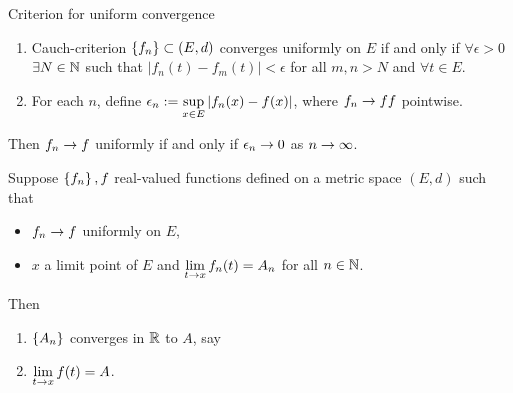 \documentclass[]{article}
\begin{document}
\begin{recall}
	Criterion for uniform convergence
	\begin{enumerate}
		\item Cauch-criterion $\left\{ f_n \right\}\subset(E,d)$ converges uniformly on $E$ if and only if $\forall\epsilon>0$ $\exists N\in\mathbb{N}$ such that $|f_n(t)-f_m(t)|<\epsilon$ for all $m,n>N$ and $\forall t\in E$.
		\item For each $n$, define $\displaystyle\epsilon_n:=\sup_{x\in E} |f_n(x)-f(x)|$, where $f_n\rightarrow ff$ pointwise.
	\end{enumerate}
	Then $f_n\rightarrow f$ uniformly if and only if $\epsilon_n\rightarrow0$ as $n\rightarrow\infty$.
\end{recall}

\newpage

\begin{theorem}
	\label{thm-7-11}
	Suppose $\left\{ f_n \right\},f$ real-valued functions defined on a metric space $(E,d)$ such that
	\begin{itemize}
		\item $f_n\rightarrow f$ uniformly on $E$,
		\item $x$ a limit point of $E$ and $\displaystyle\lim_{t\rightarrow x}f_n(t)=A_n$ for all $n\in\mathbb{N}$.
	\end{itemize}
	Then
	\begin{enumerate}
		\item $\left\{ A_n \right\}$ converges in $\mathbb{R}$ to $A$, say
		\item $\displaystyle\lim_{t\rightarrow x}f(t) = A$.
	\end{enumerate}
\end{theorem}
\end{document}
